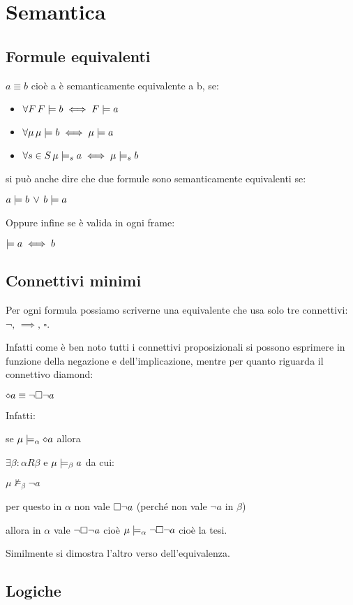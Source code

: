 
\chapter{Semantica}


\section{Formule equivalenti}

$a\equiv b$ cioè a è semanticamente equivalente a b, se:
\begin{itemize}
\item $\forall F\,F\models b\iff F\models a$
\item $\forall\mu\,\mu\models b\iff\mu\models a$
\item $\forall s\in S\,\mu\models_{s}a\iff\mu\models_{s}b$
\end{itemize}
si può anche dire che due formule sono semanticamente equivalenti
se:

$a\models b\,\vee\,b\models a$

Oppure infine se è valida in ogni frame:

$\models a\iff b$


\section{Connettivi minimi}

Per ogni formula possiamo scriverne una equivalente che usa solo tre
connettivi: $\neg,\,\implies,\,\square$.

Infatti come è ben noto tutti i connettivi proposizionali si possono
esprimere in funzione della negazione e dell'implicazione, mentre
per quanto riguarda il connettivo diamond:

$\diamond a\equiv\neg\square\neg a$

Infatti:

se $\mu\models_{\alpha}\diamond a$ allora

$\exists\beta:$$\alpha R\beta$ e $\mu\models_{\beta}a$ da cui:

$\mu\nvDash_{\beta}\neg a$

per questo in $\alpha$ non vale $\square\neg a$ (perché non vale
$\neg a$ in $\beta$)

allora in $\alpha$ vale $\neg\square\neg a$ cioè $\mu\models_{\alpha}\neg\square\neg a$
cioè la tesi. 

Similmente si dimostra l'altro verso dell'equivalenza.


\section{Logiche}


